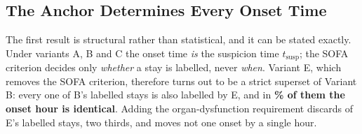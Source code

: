 \subsection{The Anchor Determines Every Onset Time}

The first result is structural rather than statistical, and it can be stated
exactly. Under variants A, B and C the onset time \emph{is} the suspicion time
$t_{\text{susp}}$; the SOFA criterion decides only \emph{whether} a stay is
labelled, never \emph{when}. Variant E, which removes the SOFA criterion,
therefore turns out to be a strict superset of Variant B: every one of B's
\pcNPositiveBPanel{} labelled stays is also labelled by E, and in
\textbf{\pcPctExactMatchE\% of them the onset hour is identical}. Adding the
organ-dysfunction requirement discards \pcNPositiveEExcessOverB{} of E's
\pcNPositiveE{} labelled stays, two thirds, and moves not one onset
by a single hour.

\begin{table}[H]
    \centering\small
    \caption{Onset agreement with Variant B across all five comparison variants,
    on the \pcNStays{} shared stays. Counts are restricted to onsets inside the
    72\,h modelling horizon so that Variant D, whose onsets exist only within the
    panel, is comparable. ``Sens.\ to B'' is the fraction of B's labelled stays
    that the variant also labels; ``exact onset match'' is computed among stays
    labelled by both.}
    \label{tab:label_agreement}
\end{table}

